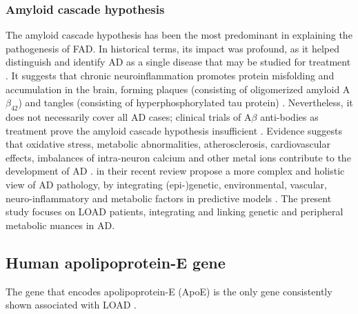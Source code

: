 \documentclass{amsart}
\theoremstyle{plain}
\begin{document}
\subsubsection{Amyloid cascade hypothesis}
The amyloid cascade hypothesis has been the most predominant in explaining the pathogenesis of FAD. In historical terms, its impact was profound, as it helped distinguish and identify AD as a single disease that may be studied for treatment \cite{Hardy2006AlzheimersReappraisal}. It suggests that chronic neuroinflammation promotes protein misfolding and accumulation in the brain, forming plaques (consisting of oligomerized amyloid A$\beta_{42}$) and tangles (consisting of hyperphosphorylated tau protein) \cite{Edwards2019ANeurodegeneration}. Nevertheless, it does not necessarily cover all AD cases; clinical trials of A$\beta$ anti-bodies as treatment prove the amyloid cascade hypothesis insufficient \cite{Kepp2023TheReview,Kurkinen2023TheThinking}. Evidence suggests that oxidative stress, metabolic abnormalities, atherosclerosis, cardiovascular effects, imbalances of intra-neuron calcium and other metal ions contribute to the development of AD \cite{Kepp2023TheReview}. \citeauthor{Kepp2023TheReview} in their recent review propose a more complex and holistic view of AD pathology, by integrating (epi-)genetic, environmental, vascular, neuro-inflammatory and metabolic factors in predictive models \cite{Kepp2023TheReview}. The present study focuses on LOAD patients, integrating and linking genetic and peripheral metabolic nuances in AD.

\subsection{Human apolipoprotein-E gene}
The gene that encodes apolipoprotein-E (ApoE) is the only gene consistently shown associated with LOAD \cite{Corder1993GeneFamilies}.
\end{document}
